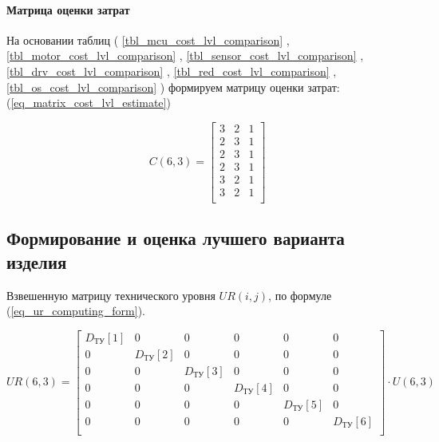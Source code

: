 \paragraph{Матрица оценки затрат}

На основании таблиц (
    \ref{tbl_mcu_cost_lvl_comparison}
  , \ref{tbl_motor_cost_lvl_comparison}
  , \ref{tbl_sensor_cost_lvl_comparison}
  , \ref{tbl_drv_cost_lvl_comparison}
  , \ref{tbl_red_cost_lvl_comparison}
  , \ref{tbl_os_cost_lvl_comparison}
)
формируем матрицу оценки затрат:
(\ref{eq_matrix_cost_lvl_estimate})

\begin{equation}
    C(6,3) =
    \begin{bmatrix}
        3 & 2 & 1 \\
        2 & 3 & 1 \\
        2 & 3 & 1 \\
        2 & 3 & 1 \\
        3 & 2 & 1 \\
        3 & 2 & 1 \\
    \end{bmatrix}
    \label{eq_matrix_cost_lvl_estimate}
\end{equation}

\subsection{Формирование и оценка лучшего варианта изделия}
Взвешенную матрицу технического уровня $UR(i, j)$, по формуле
(\ref{eq_ur_computing_form}).

\begin{equation}
    UR(6,3) =
        \begin{bmatrix}
            D_\text{ТУ}[1] & 0 & 0 & 0 & 0 & 0 \\
            0 & D_\text{ТУ}[2] & 0 & 0 & 0 & 0 \\
            0 & 0 & D_\text{ТУ}[3] & 0 & 0 & 0 \\
            0 & 0 & 0 & D_\text{ТУ}[4] & 0 & 0 \\
            0 & 0 & 0 & 0 & D_\text{ТУ}[5] & 0 \\
            0 & 0 & 0 & 0 & 0 & D_\text{ТУ}[6] \\
        \end{bmatrix}
        \cdot
        U(6,3)
    \label{eq_ur_computing_form}
\end{equation}

